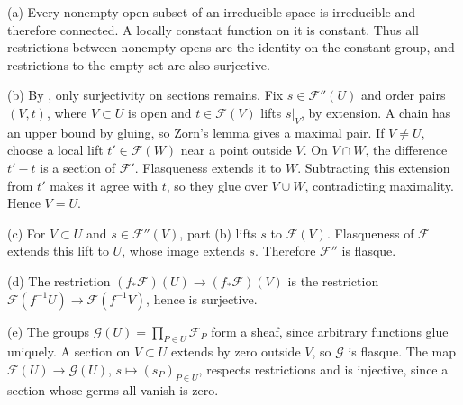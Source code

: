 (a) Every nonempty open subset of an irreducible space is irreducible and therefore connected. A locally constant function on it is constant. Thus all restrictions between nonempty opens are the identity on the constant group, and restrictions to the empty set are also surjective.

(b) By , only surjectivity on sections remains. Fix $s\in\mathscr F''(U)$ and order pairs $(V,t)$, where $V\subset U$ is open and $t\in\mathscr F(V)$ lifts $s|_V$, by extension. A chain has an upper bound by gluing, so Zorn's lemma gives a maximal pair. If $V\ne U$, choose a local lift $t'\in\mathscr F(W)$ near a point outside $V$. On $V\cap W$, the difference $t'-t$ is a section of $\mathscr F'$. Flasqueness extends it to $W$. Subtracting this extension from $t'$ makes it agree with $t$, so they glue over $V\cup W$, contradicting maximality. Hence $V=U$.

(c) For $V\subset U$ and $s\in\mathscr F''(V)$, part (b) lifts $s$ to $\mathscr F(V)$. Flasqueness of $\mathscr F$ extends this lift to $U$, whose image extends $s$. Therefore $\mathscr F''$ is flasque.

(d) The restriction $(f_*\mathscr F)(U)\to(f_*\mathscr F)(V)$ is the restriction $\mathscr F(f^{-1}U)\to\mathscr F(f^{-1}V)$, hence is surjective.

(e) The groups $\mathscr G(U)=\prod_{P\in U}\mathscr F_P$ form a sheaf, since arbitrary functions glue uniquely. A section on $V\subset U$ extends by zero outside $V$, so $\mathscr G$ is flasque. The map $\mathscr F(U)\to\mathscr G(U)$, $s\mapsto(s_P)_{P\in U}$, respects restrictions and is injective, since a section whose germs all vanish is zero.
